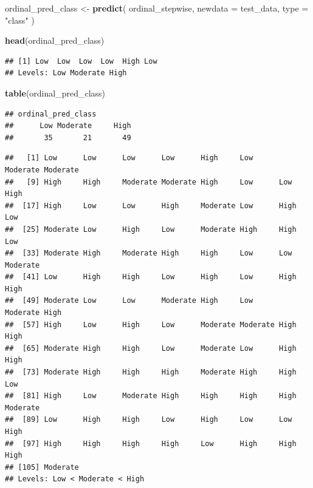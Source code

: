 \documentclass[
]{article}
\newenvironment{Shaded}{\begin{snugshade}}{\end{snugshade}}
\newcommand{\AttributeTok}[1]{\textcolor[rgb]{0.13,0.29,0.53}{#1}}
\newcommand{\FunctionTok}[1]{\textcolor[rgb]{0.13,0.29,0.53}{\textbf{#1}}}
\newcommand{\NormalTok}[1]{#1}
\newcommand{\OtherTok}[1]{\textcolor[rgb]{0.56,0.35,0.01}{#1}}
\newcommand{\SpecialCharTok}[1]{\textcolor[rgb]{0.81,0.36,0.00}{\textbf{#1}}}
\newcommand{\StringTok}[1]{\textcolor[rgb]{0.31,0.60,0.02}{#1}}
\begin{document}
\begin{Shaded}
\begin{Highlighting}[]
\NormalTok{ordinal\_pred\_class }\OtherTok{\textless{}{-}} \FunctionTok{predict}\NormalTok{(}
\NormalTok{  ordinal\_stepwise,}
  \AttributeTok{newdata =}\NormalTok{ test\_data,}
  \AttributeTok{type =} \StringTok{"class"}
\NormalTok{)}

\FunctionTok{head}\NormalTok{(ordinal\_pred\_class)}
\end{Highlighting}
\end{Shaded}

\begin{verbatim}
## [1] Low  Low  Low  Low  High Low 
## Levels: Low Moderate High
\end{verbatim}

\begin{Shaded}
\begin{Highlighting}[]
\FunctionTok{table}\NormalTok{(ordinal\_pred\_class)}
\end{Highlighting}
\end{Shaded}

\begin{verbatim}
## ordinal_pred_class
##      Low Moderate     High 
##       35       21       49
\end{verbatim}

\begin{Shaded}
\end{Shaded}

\begin{verbatim}
##   [1] Low      Low      Low      Low      High     Low      Moderate Moderate
##   [9] High     High     Moderate Moderate High     Low      Low      High    
##  [17] High     Low      Low      High     Moderate Low      High     Low     
##  [25] Moderate Low      High     Low      Moderate High     High     Low     
##  [33] Moderate High     Moderate High     High     Low      Low      Moderate
##  [41] Low      High     High     Low      High     Low      High     High    
##  [49] Moderate Low      Low      Moderate High     Low      Moderate High    
##  [57] High     Low      High     Low      Moderate Moderate High     High    
##  [65] Moderate High     High     Low      Moderate Low      High     High    
##  [73] Moderate High     High     High     Moderate High     High     Low     
##  [81] High     Low      Moderate High     High     High     High     Moderate
##  [89] Low      High     High     Low      High     Low      Low      High    
##  [97] High     High     High     High     Low      High     High     High    
## [105] Moderate
## Levels: Low < Moderate < High
\end{verbatim}
\end{document}
